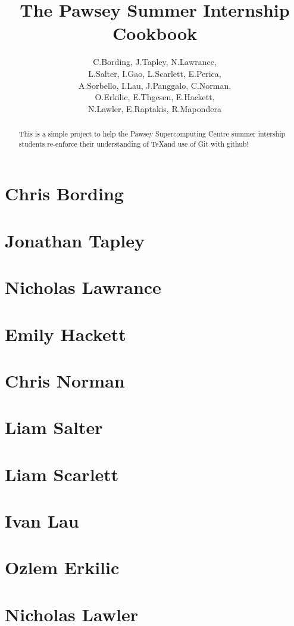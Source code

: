 \documentclass[11pt,a4paper]{report}
\title{The Pawsey Summer Internship Cookbook}
\author{C.Bording, J.Tapley, N.Lawrance,\\
L.Salter, I.Gao, L.Scarlett, E.Perica,\\
A.Sorbello, I.Lau, J.Panggalo, C.Norman,\\
O.Erkilic, E.Thgesen, E.Hackett,\\
N.Lawler, E.Raptakis, R.Mapondera}
\begin{document}
\maketitle
\tableofcontents


\begin{abstract}

This is a simple project to help the Pawsey Supercomputing Centre summer intership students re-enforce their understanding of \TeX and use of Git with github!

\end{abstract}

\chapter{Chris Bording}



\chapter{Jonathan Tapley}


\chapter{Nicholas Lawrance}


\chapter{Emily Hackett}


\chapter{Chris Norman}

\chapter{Liam Salter}


\chapter{Liam Scarlett}


\chapter{Ivan Lau}


\chapter{Ozlem Erkilic}


\chapter{Nicholas Lawler}

\end{document}
